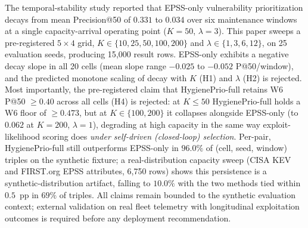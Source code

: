 The temporal-stability study reported that EPSS-only vulnerability prioritization decays
from mean Precision@50 of $0.331$ to $0.034$ over six maintenance
windows at a single capacity-arrival operating point ($K = 50$,
$\lambda = 3$). This paper sweeps a pre-registered $5 \times 4$ grid,
$K \in \{10, 25, 50, 100, 200\}$ and $\lambda \in \{1, 3, 6, 12\}$,
on 25 evaluation seeds, producing 15{,}000 result rows. EPSS-only
exhibits a negative decay slope in all 20 cells (mean slope range
$-0.025$ to $-0.052$ P@50/window), and the predicted monotone scaling
of decay with $K$ (H1) and $\lambda$ (H2) is rejected. Most
importantly, the pre-registered claim that HygienePrio-full retains
W6 P@50 $\geq 0.40$ across all cells (H4) is rejected: at
$K \leq 50$ HygienePrio-full holds a W6 floor of $\geq 0.473$, but at
$K \in \{100, 200\}$ it collapses alongside EPSS-only (to $0.062$ at
$K = 200$, $\lambda = 1$), degrading at high capacity in the same way
exploit-likelihood scoring does \emph{under self-driven (closed-loop)
selection}. Per-pair, HygienePrio-full still outperforms EPSS-only in
$96.0\%$ of (cell, seed, window) triples on the synthetic fixture; a
real-distribution capacity sweep (CISA KEV and FIRST.org EPSS
attributes, 6{,}750 rows) shows this persistence is a
synthetic-distribution artifact, falling to $10.0\%$ with the two
methods tied within $0.5$~pp in $69\%$ of triples. All claims remain
bounded to the synthetic evaluation context; external validation on
real fleet telemetry with longitudinal exploitation outcomes is
required before any deployment recommendation.

